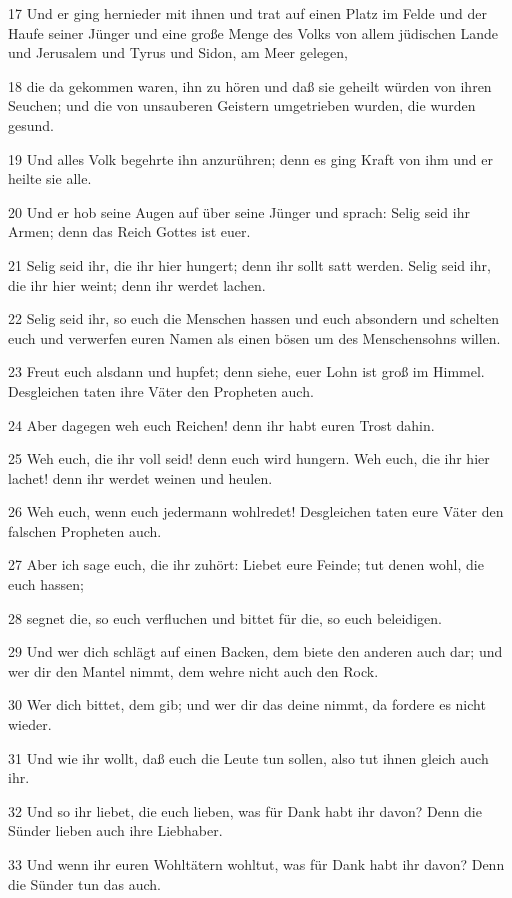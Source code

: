 \par 17 Und er ging hernieder mit ihnen und trat auf einen Platz im Felde und der Haufe seiner Jünger und eine große Menge des Volks von allem jüdischen Lande und Jerusalem und Tyrus und Sidon, am Meer gelegen,
\par 18 die da gekommen waren, ihn zu hören und daß sie geheilt würden von ihren Seuchen; und die von unsauberen Geistern umgetrieben wurden, die wurden gesund.
\par 19 Und alles Volk begehrte ihn anzurühren; denn es ging Kraft von ihm und er heilte sie alle.
\par 20 Und er hob seine Augen auf über seine Jünger und sprach: Selig seid ihr Armen; denn das Reich Gottes ist euer.
\par 21 Selig seid ihr, die ihr hier hungert; denn ihr sollt satt werden. Selig seid ihr, die ihr hier weint; denn ihr werdet lachen.
\par 22 Selig seid ihr, so euch die Menschen hassen und euch absondern und schelten euch und verwerfen euren Namen als einen bösen um des Menschensohns willen.
\par 23 Freut euch alsdann und hupfet; denn siehe, euer Lohn ist groß im Himmel. Desgleichen taten ihre Väter den Propheten auch.
\par 24 Aber dagegen weh euch Reichen! denn ihr habt euren Trost dahin.
\par 25 Weh euch, die ihr voll seid! denn euch wird hungern. Weh euch, die ihr hier lachet! denn ihr werdet weinen und heulen.
\par 26 Weh euch, wenn euch jedermann wohlredet! Desgleichen taten eure Väter den falschen Propheten auch.
\par 27 Aber ich sage euch, die ihr zuhört: Liebet eure Feinde; tut denen wohl, die euch hassen;
\par 28 segnet die, so euch verfluchen und bittet für die, so euch beleidigen.
\par 29 Und wer dich schlägt auf einen Backen, dem biete den anderen auch dar; und wer dir den Mantel nimmt, dem wehre nicht auch den Rock.
\par 30 Wer dich bittet, dem gib; und wer dir das deine nimmt, da fordere es nicht wieder.
\par 31 Und wie ihr wollt, daß euch die Leute tun sollen, also tut ihnen gleich auch ihr.
\par 32 Und so ihr liebet, die euch lieben, was für Dank habt ihr davon? Denn die Sünder lieben auch ihre Liebhaber.
\par 33 Und wenn ihr euren Wohltätern wohltut, was für Dank habt ihr davon? Denn die Sünder tun das auch.
